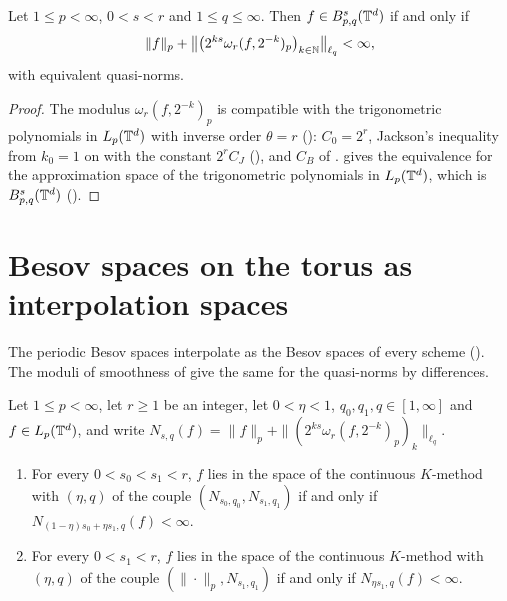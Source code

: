 \begin{theorem}
\label{thm:torus-lp-moduli}
\leanok
{}
Let $1 \leq p < \infty$, $0 < s < r$ and $1 \leq q \leq \infty$. Then
$f \in B^{s}_{p,q}(\mathbb{T}^d)$ if and only if
\[
  \|f\|_p + \bigl\| \bigl(2^{ks} \omega_r(f, 2^{-k})_p\bigr)_{k \in \mathbb{N}} \bigr\|_{\ell_q} < \infty ,
\]
with equivalent quasi-norms.
\end{theorem}

\begin{proof}
\leanok
{}
The modulus $\omega_r(f, 2^{-k})_p$ is compatible with the trigonometric polynomials in
$L_p(\mathbb{T}^d)$ with inverse order $\theta = r$ (): $C_0 = 2^r$, Jackson's
inequality from $k_0 = 1$ on with the constant $2^r C_J$ (), and
$C_B$ of .  gives the equivalence
for the approximation space of the trigonometric polynomials in $L_p(\mathbb{T}^d)$, which is
$B^{s}_{p,q}(\mathbb{T}^d)$ ().
\end{proof}

\section{Besov spaces on the torus as interpolation spaces}
\label{sec:torus-besov-interpolation}

The periodic Besov spaces interpolate as the Besov spaces of every scheme
(). The moduli of smoothness of  give the
same for the quasi-norms by differences.

\begin{theorem}
\label{thm:torus-besov-interpolate}
\leanok
{}
Let $1 \leq p < \infty$, let $r \geq 1$ be an integer, let $0 < \eta < 1$,
$q_0, q_1, q \in [1, \infty]$ and $f \in L_p(\mathbb{T}^d)$, and write
$N_{s, q}(f) = \|f\|_p + \|(2^{ks} \omega_r(f, 2^{-k})_p)_k\|_{\ell_q}$.
\begin{enumerate}
  \item For every $0 < s_0 < s_1 < r$, $f$ lies in the space of the continuous $K$-method with
    $(\eta, q)$ of the couple $(N_{s_0, q_0}, N_{s_1, q_1})$ if and only if
    $N_{(1-\eta)s_0 + \eta s_1, q}(f) < \infty$.
  \item For every $0 < s_1 < r$, $f$ lies in the space of the continuous $K$-method with
    $(\eta, q)$ of the couple $(\|\cdot\|_p, N_{s_1, q_1})$ if and only if
    $N_{\eta s_1, q}(f) < \infty$.
\end{enumerate}
\end{theorem}

